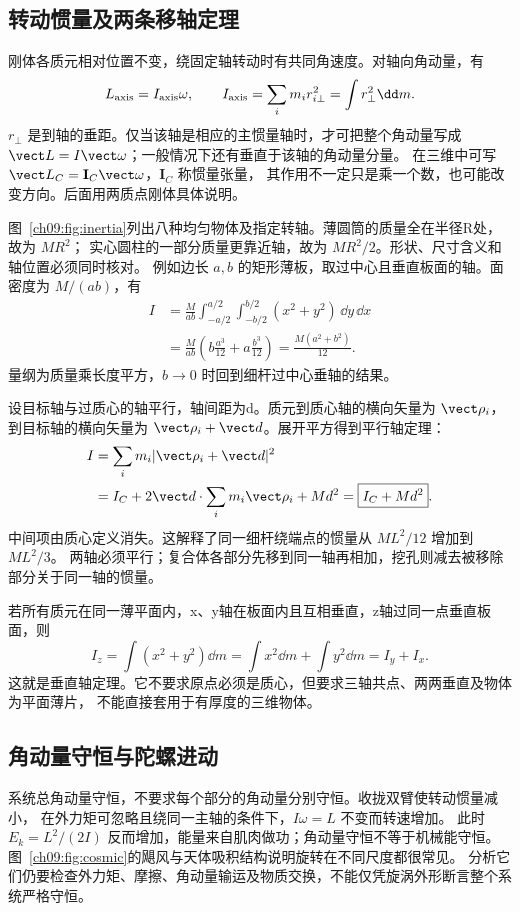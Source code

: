 \subsection{转动惯量及两条移轴定理}
刚体各质元相对位置不变，绕固定轴转动时有共同角速度。对轴向角动量，有
\begin{equation}
 L_{\rm axis}=I_{\rm axis}\omega,\qquad
 I_{\rm axis}=\sum_i m_i r_{i\perp}^2=\int r_\perp^2\dd m.
\end{equation}
$r_\perp$ 是到轴的垂距。仅当该轴是相应的主惯量轴时，才可把整个角动量写成
$\vect L=I\vect\omega$；一般情况下还有垂直于该轴的角动量分量。
在三维中可写 $\vect L_C=\mathbf I_C\vect\omega$，$\mathbf I_C$ 称惯量张量，
其作用不一定只是乘一个数，也可能改变方向。后面用两质点刚体具体说明。

图~\ref{ch09:fig:inertia}列出八种均匀物体及指定转轴。薄圆筒的质量全在半径R处，故为 $MR^2$；
实心圆柱的一部分质量更靠近轴，故为 $MR^2/2$。形状、尺寸含义和轴位置必须同时核对。
\momentsContextDiagram
例如边长 $a,b$ 的矩形薄板，取过中心且垂直板面的轴。面密度为 $M/(ab)$，有
\begin{align}
 I&=\frac{M}{ab}\int_{-a/2}^{a/2}\int_{-b/2}^{b/2}(x^2+y^2)\,\dd y\,\dd x\\
 &=\frac{M}{ab}\left(b\frac{a^3}{12}+a\frac{b^3}{12}\right)
 =\frac{M(a^2+b^2)}{12}.
\end{align}
量纲为质量乘长度平方，$b\to0$ 时回到细杆过中心垂轴的结果。

设目标轴与过质心的轴平行，轴间距为d。质元到质心轴的横向矢量为 $\vect\rho_i$，
到目标轴的横向矢量为 $\vect\rho_i+\vect d$。展开平方得到平行轴定理：
\begin{align}
 I&=\sum_i m_i|\vect\rho_i+\vect d|^2\\
 &=I_C+2\vect d\cdot\sum_i m_i\vect\rho_i+Md^2
 =\boxed{I_C+Md^2}.
\end{align}
中间项由质心定义消失。这解释了同一细杆绕端点的惯量从 $ML^2/12$ 增加到 $ML^2/3$。
两轴必须平行；复合体各部分先移到同一轴再相加，挖孔则减去被移除部分关于同一轴的惯量。

若所有质元在同一薄平面内，x、y轴在板面内且互相垂直，z轴过同一点垂直板面，则
\begin{equation}
 I_z=\int(x^2+y^2)\dd m=\int x^2\dd m+\int y^2\dd m=I_y+I_x.
\end{equation}
这就是垂直轴定理。它不要求原点必须是质心，但要求三轴共点、两两垂直及物体为平面薄片，
不能直接套用于有厚度的三维物体。

\subsection{角动量守恒与陀螺进动}
系统总角动量守恒，不要求每个部分的角动量分别守恒。收拢双臂使转动惯量减小，
在外力矩可忽略且绕同一主轴的条件下，$I\omega=L$ 不变而转速增加。
此时 $E_k=L^2/(2I)$ 反而增加，能量来自肌肉做功；角动量守恒不等于机械能守恒。
图~\ref{ch09:fig:cosmic}的飓风与天体吸积结构说明旋转在不同尺度都很常见。
分析它们仍要检查外力矩、摩擦、角动量输运及物质交换，不能仅凭旋涡外形断言整个系统严格守恒。

